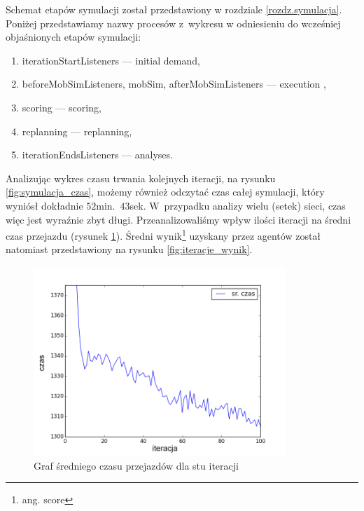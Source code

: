 \documentclass[twoside,12pt]{report}
\begin{document}
Schemat etapów symulacji został przedstawiony w rozdziale \ref{rozdz.symulacja}. Poniżej przedstawiamy nazwy procesów z~wykresu w odniesieniu do wcześniej objaśnionych etapów symulacji:
\begin{enumerate}
\item iterationStartListeners --- initial demand,
\item beforeMobSimListeners, mobSim, afterMobSimListeners --- execution , 
\item scoring --- scoring,
\item replanning --- replanning,
\item iterationEndsListeners --- analyses.
\end{enumerate}

Analizując wykres czasu trwania kolejnych iteracji, na rysunku \ref{fig:symulacja_czas}, możemy również odczytać czas całej symulacji, który wyniósł dokładnie $52$min.~$43$sek.  W~przypadku analizy wielu (setek) sieci, czas więc jest wyraźnie zbyt długi. Przeanalizowaliśmy wpływ ilości iteracji na średni czas przejazdu (rysunek \ref{fig:iteracje_czas}). Średni wynik\footnote{ang. score} uzyskany przez agentów został natomiast przedstawiony na rysunku \ref{fig:iteracje_wynik}.

\begin{figure}[htbp]
	\centering
	\includegraphics[width=0.85\textwidth]{img/def_iters}
	\caption{Graf średniego czasu przejazdów dla stu iteracji}
	\label{fig:iteracje_czas}
\end{figure}
\end{document}

